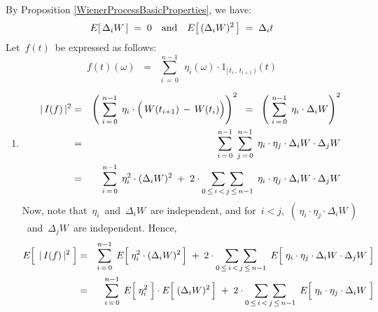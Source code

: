 By Proposition \ref{WienerProcessBasicProperties}, we have:
\begin{equation*}
E\!\left[\,\Delta_{i}W\,\right] \; = \; 0
\quad\textnormal{and}\quad
E\!\left[\,(\Delta_{i}W)^{2}\,\right] \; = \; \Delta_{i}t
\end{equation*}
Let \,$f(t)$\, be expressed as follows:
\begin{equation*}
f(t)(\omega)
\;\; = \;\;
	\overset{n-1}{\underset{i\,=\,0}{\sum}}\;\,
	\eta_{i}(\omega) \cdot 1_{[\,t_{i}\,,\,t_{i+1}\,)}(t)
\end{equation*}
\begin{enumerate}
\item
	\begin{eqnarray*}
	\vert\, I(f) \,\vert^{2}
	& = &
		\left(\;
			\overset{n-1}{\underset{i\,=\,0}{\sum}}\;\,
			\eta_{i} \cdot \left(\, W(t_{i+1}) \,\overset{{\color{white}.}}{-}\, W(t_{i}) \right)
			\right)^{2}
	\;\; = \;\;
		\left(\;
			\overset{n-1}{\underset{i\,=\,0}{\sum}}\;\,
			\eta_{i} \cdot \Delta_{i}W
			\right)^{2}
	\\
	& = &
		\overset{n-1}{\underset{i\,=\,0}{\sum}}\;\,
		\overset{n-1}{\underset{j\,=\,0}{\sum}}\;\,
		\eta_{i} \cdot \eta_{j} \cdot \Delta_{i}W \cdot \Delta_{j}W
	\\
	& = &
		\overset{n-1}{\underset{i\,=\,0}{\sum}}\;\,
		\eta_{i}^{2} \cdot (\Delta_{i}W)^{2}
		\; + \;
		2 \cdot
		\underset{0 \,\leq\, i \,<\, j \,\leq\, n-1}{\sum\;\sum}\;\,
		\eta_{i} \cdot \eta_{j} \cdot \Delta_{i}W \cdot \Delta_{j}W
	\end{eqnarray*}
	Now, note that \,$\eta_{i}$\, and \,$\Delta_{i}W$\, are independent, and
	for \,$i < j$, \,$(\,\eta_{i}\cdot\eta_{j}\cdot\Delta_{i}W\,)$\, and \,$\Delta_{j}W$\, are independent.
	Hence,
	\begin{eqnarray*}
	E\!\left[\;\, \overset{{\color{white}.}}{\vert\, I(f) \,\vert^{2}} \;\right]
	& = &
		\overset{n-1}{\underset{i\,=\,0}{\sum}}\;\,
		E\!\left[\; \overset{{\color{white}.}}{\eta_{i}^{2}} \cdot (\Delta_{i}W)^{2} \,\right]
		\; + \;
		2 \cdot
		\underset{0 \,\leq\, i \,<\, j \,\leq\, n-1}{\sum\;\sum}\;\,
		E\!\left[\; \overset{{\color{white}1}}{\eta_{i}} \cdot \eta_{j} \cdot \Delta_{i}W \cdot \Delta_{j}W \;\right]
	\\
	& = &
		\overset{n-1}{\underset{i\,=\,0}{\sum}}\;\,
		E\!\left[\; \overset{{\color{white}.}}{\eta_{i}^{2}} \;\right] \cdot E\!\left[\; \overset{{\color{white}.}}{(\Delta_{i}W)^{2}} \,\right]
		\; + \;
		2 \cdot
		\underset{0 \,\leq\, i \,<\, j \,\leq\, n-1}{\sum\;\sum}\;\,
		E\!\left[\; \overset{{\color{white}1}}{\eta_{i}} \cdot \eta_{j} \cdot \Delta_{i}W \;\right]

\end{eqnarray*}
\end{enumerate}
